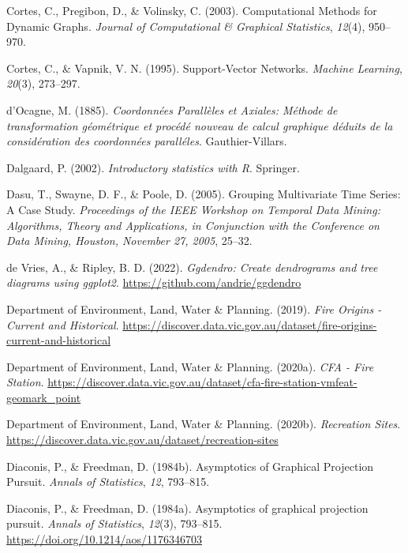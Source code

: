 \documentclass[
  letterpaper,
]{krantz}
\newlength{\cslhangindent}
\newenvironment{CSLReferences}[2] %
 {\begin{list}{}{%
  \setlength{\itemindent}{0pt}
  \setlength{\leftmargin}{0pt}
  \setlength{\parsep}{0pt}
  \ifodd #1
   \setlength{\leftmargin}{\cslhangindent}
   \setlength{\itemindent}{-1\cslhangindent}
  \fi
  \setlength{\itemsep}{#2\baselineskip}}}
 {\end{list}}
\begin{document}
\begin{CSLReferences}{1}{0}
Cortes, C., Pregibon, D., \& Volinsky, C. (2003). Computational
{M}ethods for {D}ynamic {G}raphs. \emph{Journal of Computational \&
Graphical Statistics}, \emph{12}(4), 950--970.

Cortes, C., \& Vapnik, V. N. (1995). Support-{V}ector {N}etworks.
\emph{Machine Learning}, \emph{20}(3), 273--297.

d'Ocagne, M. (1885). \emph{{C}oordonnées {P}arallèles et {A}xiales:
{M}éthode de transformation géométrique et procédé nouveau de calcul
graphique déduits de la considération des coordonnées paralléles}.
Gauthier-Villars.

Dalgaard, P. (2002). \emph{Introductory statistics with {R}}. Springer.

Dasu, T., Swayne, D. F., \& Poole, D. (2005). Grouping {M}ultivariate
{T}ime {S}eries: A {C}ase {S}tudy. \emph{Proceedings of the IEEE
Workshop on {T}emporal {D}ata {M}ining: {A}lgorithms, {T}heory and
{A}pplications, in Conjunction with the Conference on Data Mining,
Houston, November 27, 2005}, 25--32.

de Vries, A., \& Ripley, B. D. (2022). \emph{Ggdendro: Create
dendrograms and tree diagrams using ggplot2}.
\url{https://github.com/andrie/ggdendro}

Department of Environment, Land, Water \& Planning. (2019). \emph{{Fire
Origins - Current and Historical}}.
\url{https://discover.data.vic.gov.au/dataset/fire-origins-current-and-historical}

Department of Environment, Land, Water \& Planning. (2020a). \emph{{CFA
- Fire Station}}.
\url{https://discover.data.vic.gov.au/dataset/cfa-fire-station-vmfeat-geomark_point}

Department of Environment, Land, Water \& Planning. (2020b).
\emph{{Recreation Sites}}.
\url{https://discover.data.vic.gov.au/dataset/recreation-sites}

Diaconis, P., \& Freedman, D. (1984b). {A}symptotics of {G}raphical
{P}rojection {P}ursuit. \emph{Annals of Statistics}, \emph{12},
793--815.

Diaconis, P., \& Freedman, D. (1984a). Asymptotics of graphical
projection pursuit. \emph{Annals of Statistics}, \emph{12}(3), 793--815.
\url{https://doi.org/10.1214/aos/1176346703}


\end{CSLReferences}
\end{document}
